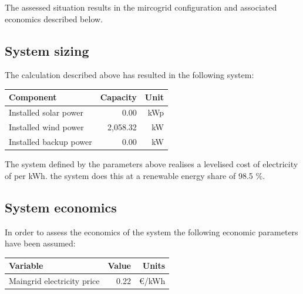 \documentclass{article}[11pt]
\begin{document}
\begin{multicols}{2}
The assessed situation results in the mircogrid configuration and associated economics described below.

\subsection*{System sizing}

The calculation described above has resulted in the following system:

{\color{black}\begin{flushleft}

\begin{tabular}{|l|r|r|}

\hline Component&Capacity&Unit\\ \hline 

Installed solar power&0.00&kWp\\ 

Installed wind power&2,058.32&kW\\ 

Installed backup power&0.00&kW\\ 

\hline

\end{tabular}

\label{tab:systemlayout}

\end{flushleft}}\vspace{0.5mm}

The system defined by the parameters above realises a levelised cost of electricity of  per kWh. the system does this at a renewable energy share of 98.5 \%. 

\subsection*{System economics}

In order to assess the economics of the system the following economic parameters have been assumed: 

{\color{black}\begin{flushleft}

\begin{tabular}{|l|r|r|}

\hline Variable&Value&Units\\ \hline 

Maingrid electricity price&0.22&\euro /kWh\\ 


\end{tabular}
\end{flushleft}}
\end{multicols}
\end{document}
